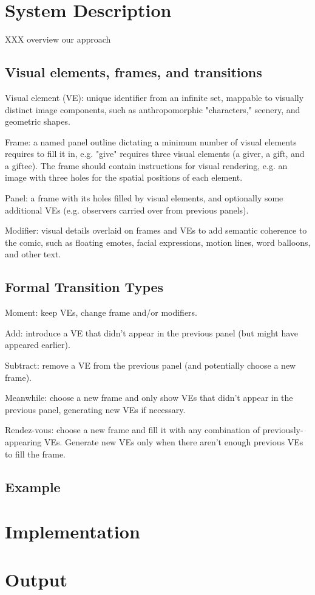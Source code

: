 \section{System Description}

XXX overview our approach

\subsection{Visual elements, frames, and transitions}


Visual element (VE): unique identifier from an infinite set, mappable to
visually distinct image components, such as anthropomorphic "characters,"
scenery, and geometric shapes.

Frame: a named panel outline dictating a minimum number of visual elements
requires to fill it in, e.g. "give" requires three visual elements (a
giver, a gift, and a giftee). The frame should contain instructions for
visual rendering, e.g. an image with three holes for the spatial positions
of each element.

Panel: a frame with its holes filled by visual elements, and optionally
some additional VEs (e.g. observers carried over from previous panels).

Modifier: visual details overlaid on frames and VEs to add semantic
coherence to the comic, such as floating emotes, facial expressions, motion
lines, word balloons, and other text.

\subsection{Formal Transition Types}


Moment: keep VEs, change frame and/or modifiers.

Add: introduce a VE that didn't appear in the previous panel (but might
have appeared earlier).

Subtract: remove a VE from the previous panel (and potentially choose a new
frame).

Meanwhile: choose a new frame and only show VEs that didn't appear in the
previous panel, generating new VEs if necessary.

Rendez-vous: choose a new frame and fill it with any combination of
previously-appearing VEs. Generate new VEs only when there aren't enough
previous VEs to fill the frame.


\subsection{Example}

\section{Implementation}

\section{Output}
